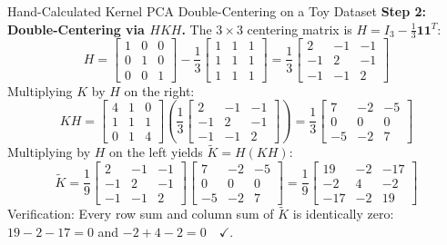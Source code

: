 \begin{examplebox}{Hand-Calculated Kernel PCA Double-Centering on a Toy Dataset}
\textbf{Step 2: Double-Centering via $H K H$.}
The $3 \times 3$ centering matrix is $H = I_3 - \frac{1}{3}\mathbf{1}\mathbf{1}^T$:
\begin{equation}
H = \begin{bmatrix} 1 & 0 & 0 \\ 0 & 1 & 0 \\ 0 & 0 & 1 \end{bmatrix} - \frac{1}{3}\begin{bmatrix} 1 & 1 & 1 \\ 1 & 1 & 1 \\ 1 & 1 & 1 \end{bmatrix} = \frac{1}{3}\begin{bmatrix} 2 & -1 & -1 \\ -1 & 2 & -1 \\ -1 & -1 & 2 \end{bmatrix}
\end{equation}
Multiplying $K$ by $H$ on the right:
\begin{equation}
K H = \begin{bmatrix} 4 & 1 & 0 \\ 1 & 1 & 1 \\ 0 & 1 & 4 \end{bmatrix} \left( \frac{1}{3}\begin{bmatrix} 2 & -1 & -1 \\ -1 & 2 & -1 \\ -1 & -1 & 2 \end{bmatrix} \right) = \frac{1}{3}\begin{bmatrix} 7 & -2 & -5 \\ 0 & 0 & 0 \\ -5 & -2 & 7 \end{bmatrix}
\end{equation}
Multiplying by $H$ on the left yields $\tilde{K} = H (K H)$:
\begin{equation}
\tilde{K} = \frac{1}{9}\begin{bmatrix} 2 & -1 & -1 \\ -1 & 2 & -1 \\ -1 & -1 & 2 \end{bmatrix} \begin{bmatrix} 7 & -2 & -5 \\ 0 & 0 & 0 \\ -5 & -2 & 7 \end{bmatrix} = \frac{1}{9}\begin{bmatrix} 19 & -2 & -17 \\ -2 & 4 & -2 \\ -17 & -2 & 19 \end{bmatrix}
\end{equation}
Verification: Every row sum and column sum of $\tilde{K}$ is identically zero:
$19 - 2 - 17 = 0$ and $-2 + 4 - 2 = 0 \quad \checkmark$.


\end{examplebox}
